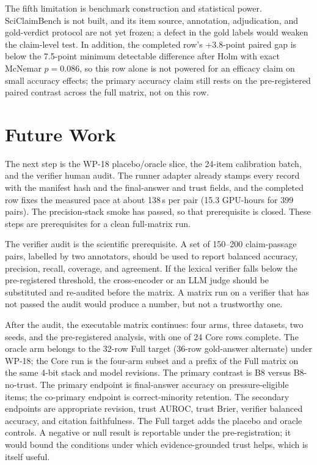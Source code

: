 The fifth limitation is benchmark construction and statistical power. SciClaimBench is not built, and its item source, annotation, adjudication, and gold-verdict protocol are not yet frozen; a defect in the gold labels would weaken the claim-level test. In addition, the completed row's +3.8-point paired gap is below the 7.5-point minimum detectable difference after Holm with exact McNemar $p=0.086$, so this row alone is not powered for an efficacy claim on small accuracy effects; the primary accuracy claim still rests on the pre-registered paired contrast across the full matrix, not on this row.

\section{Future Work}\label{sec:conclusion-future}

The next step is the WP-18 placebo/oracle slice, the 24-item calibration batch, and the verifier human audit. The runner adapter already stamps every record with the manifest hash and the final-answer and trust fields, and the completed row fixes the measured pace at about 138\,s per pair (15.3 GPU-hours for 399 pairs). The precision-stack smoke has passed, so that prerequisite is closed. These steps are prerequisites for a clean full-matrix run.

The verifier audit is the scientific prerequisite. A set of 150--200 claim-passage pairs, labelled by two annotators, should be used to report balanced accuracy, precision, recall, coverage, and agreement. If the lexical verifier falls below the pre-registered threshold, the cross-encoder or an LLM judge should be substituted and re-audited before the matrix. A matrix run on a verifier that has not passed the audit would produce a number, but not a trustworthy one.

After the audit, the executable matrix continues: four arms, three datasets, two seeds, and the pre-registered analysis, with one of 24 Core rows complete. The oracle arm belongs to the 32-row Full target (36-row gold-answer alternate) under WP-18; the Core run is the four-arm subset and a prefix of the Full matrix on the same 4-bit stack and model revisions. The primary contrast is B8 versus B8-no-trust. The primary endpoint is final-answer accuracy on pressure-eligible items; the co-primary endpoint is correct-minority retention. The secondary endpoints are appropriate revision, trust AUROC, trust Brier, verifier balanced accuracy, and citation faithfulness. The Full target adds the placebo and oracle controls. A negative or null result is reportable under the pre-registration; it would bound the conditions under which evidence-grounded trust helps, which is itself useful.

